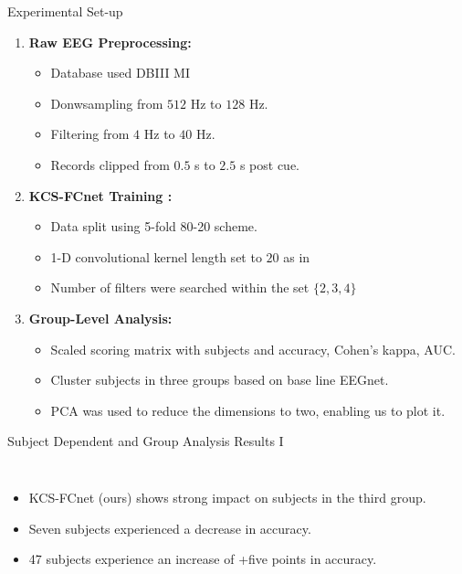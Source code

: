 \documentclass[aspectratio=169]{beamer}
\let\oldcite\cite %
\renewcommand{\cite}[1]{{\tiny\oldcite{#1}}}
\begin{document}
\begin{frame}{Experimental Set-up}
    \begin{enumerate}
        \item \textbf{Raw EEG Preprocessing:} 
        \begin{itemize}
            \item Database used DBIII MI
            \item Donwsampling from $512$ Hz to $128$ Hz. 
            \item Filtering from $4$ Hz to $40$ Hz. 
            \item Records clipped from $0.5$ s to $2.5$ s post cue.
        \end{itemize}
        \item \textbf{KCS-FCnet Training \cite{lawhern2018eegnet, schirrmeister2017deep}:}
        \begin{itemize}
            \item Data split using 5-fold 80-20 scheme.
            \item 1-D convolutional kernel length set to $20$ as in
            \item Number of filters were searched within the set $\{2,3,4\}$
        \end{itemize}
        \item \textbf{Group-Level Analysis:}
        \begin{itemize}
            \item Scaled scoring matrix with subjects and accuracy, Cohen's kappa, AUC.
            \item Cluster subjects in three groups based on base line EEGnet.
            \item PCA was used to reduce the dimensions to two, enabling us to plot it.
        \end{itemize}
    \end{enumerate}
\end{frame}

\begin{frame}{Subject Dependent and Group Analysis Results I}
    \begin{columns}
            \centering
            \resizebox{1.1\linewidth}{!}{}
        \begin{itemize}
            \item KCS-FCnet (ours) shows strong impact on subjects in the third group.
            \item Seven subjects experienced a decrease in accuracy.
            \item 47 subjects experience an increase of +five points in accuracy.
        \end{itemize}
    \end{columns}

\end{frame}
\end{document}
